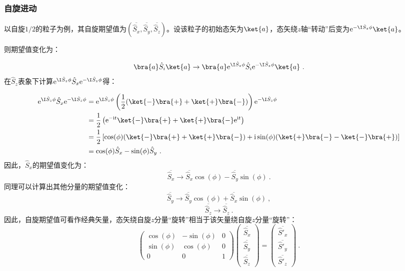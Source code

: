 \subsubsection{自旋进动}
以自旋$1/2$的粒子为例，其自旋期望值为$(\overline{\hat S_x},\overline{\hat S_y},\overline{\hat S_z})$。设该粒子的初始态矢为$\ket{a}$，态矢绕$z$轴“转动”后变为$\mathrm e^{- \I\hat S_z\phi}\ket{a}$。

则期望值变化为：

\begin{equation}
\bra{a}\hat S_i\ket{a}\rightarrow \bra{a}\mathrm e^{ \I\hat S_z\phi}\hat S_i\mathrm e^{- \I\hat S_z\phi}\ket{a}~.
\end{equation}
在$\hat S_z$表象下计算$\mathrm e^{ \I\hat S_z\phi}\hat S_x\mathrm e^{- \I\hat S_z\phi }$得：

\begin{equation}
\begin{aligned}
\mathrm e^{ \I\hat S_z\phi}\hat S_x\mathrm e^{- \I\hat S_z\phi}&=\mathrm e^{ \I\hat S_z\phi}\left(\frac{1}{2}(\ket{-}\bra{+}+\ket{+}\bra{-})\right)\mathrm e^{- \I\hat S_z\phi}\\
 &=\frac{1}{2}\left(\mathrm e^{-\mathrm i t}\ket{-}\bra{+}+\ket{+}\bra{-}\mathrm e^{\mathrm i t}\right)\\
 &=\frac{1}{2}\left[\cos(\phi)(\ket{-}\bra{+}+\ket{+}\bra{-})+\mathrm i\sin(\phi)(\ket{+}\bra{-}-\ket{-}\bra{+})\right]\\
 &=\cos(\phi) \hat S_x-\sin(\phi) \hat S_y~.
\end{aligned}
\end{equation}
因此，$\hat S_x$的期望值变化为：
\begin{equation}
\overline{\hat S_x}\rightarrow  \overline{\hat S_x}\cos(\phi)-\overline{\hat S_y}\sin(\phi)~.
\end{equation}
同理可以计算出其他分量的期望值变化：
\begin{equation}
\overline{\hat S_y}\rightarrow \overline{\hat S_y}\cos(\phi)+\overline{\hat S_x}\sin(\phi)~,
\end{equation}
\begin{equation}
\overline{\hat S_z}\rightarrow \overline{\hat S_z}~.
\end{equation}
因此，自旋期望值可看作经典矢量，态矢绕自旋$z$分量“旋转”相当于该矢量绕自旋$z$分量“旋转”：
\begin{equation}
\begin{pmatrix}
 \cos(\phi) &-\sin(\phi)  &0 \\
  \sin(\phi) & \cos(\phi)  & 0\\
  0& 0 &1
\end{pmatrix}
\begin{pmatrix}
 \overline{\hat S_x}\\
  \overline{\hat S_y}\\
 \overline{\hat S_z}
\end{pmatrix}
=
\begin{pmatrix}
  \overline{\hat S'_x}\\
  \overline{\hat S'_y}\\
 \overline{\hat S'_z}
\end{pmatrix}~.
\end{equation}





